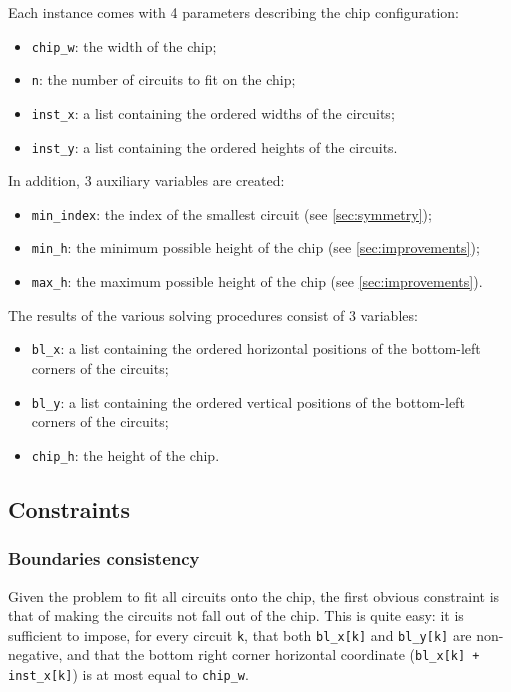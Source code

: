 \documentclass[a4paper, 12pt]{article}
\begin{document}
Each instance comes with 4 parameters describing the chip configuration:
\begin{itemize}
    \item \verb|chip_w|: the width of the chip;
    \item \verb|n|: the number of circuits to fit on the chip;
    \item \verb|inst_x|: a list containing the ordered widths of the circuits;
    \item \verb|inst_y|: a list containing the ordered heights of the circuits.
\end{itemize}
In addition, 3 auxiliary variables are created:
\begin{itemize}
    \item \verb|min_index|: the index of the smallest circuit (see \cref{sec:symmetry});
    \item \verb|min_h|: the minimum possible height of the chip (see \cref{sec:improvements});
    \item \verb|max_h|: the maximum possible height of the chip (see \cref{sec:improvements}).
\end{itemize}
The results of the various solving procedures consist of 3 variables:
\begin{itemize}
    \item \verb|bl_x|: a list containing the ordered horizontal positions of the bottom-left corners of the circuits;
    \item \verb|bl_y|: a list containing the ordered vertical positions of the bottom-left corners of the circuits;
    \item \verb|chip_h|: the height of the chip.
\end{itemize}


\subsection{Constraints}


\subsubsection{Boundaries consistency}

Given the problem to fit all circuits onto the chip, the first obvious constraint is that of making the circuits not fall out of the chip. This is quite easy: it is sufficient to impose, for every circuit \verb|k|, that both \verb|bl_x[k]| and \verb|bl_y[k]| are non-negative, and that the bottom right corner horizontal coordinate (\verb|bl_x[k] + inst_x[k]|) is at most equal to \verb|chip_w|.
\end{document}
